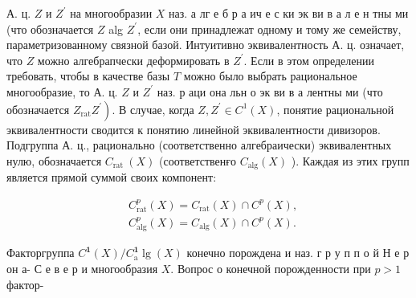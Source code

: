 \documentclass[10pt]{article}
\begin{document}
А. ц. $Z$ и $Z^{\prime}$ на многообразии $X$ наз. а лг е б р а ич е с ки эк ви в а л е н тны ми (что обозначается $Z$ alg $Z^{\prime}$, если они принадлежат одному и тому же семейству, параметризованному связной базой. Интуитивно эквивалентность А. ц. означает, что $Z$ можно алгебрапчески деформировать в $Z^{\prime}$. Если в этом определении требовать, чтобы в качестве базы $T$ можно было выбрать рациональное многообразие, то А. ц. $Z$ и $Z^{\prime}$ наз. р аци она льн о эк ви в а лентны ми (что обозначается $\left.Z_{\mathrm{rat}} Z^{\prime}\right)$. В случае, когда $Z, Z^{\prime} \in C^{1}(X)$, понятие рациональной эквивалентности сводится к понятию линейной эквивалентности дивизоров. Подгруппа А. ц., рационально (соответственно алгебраически) эквивалентных нулю, обозначается $C_{\text {rat }}(X)$ (соответственғо $C_{\mathrm{alg}}(X)$ ). Каждая из этих групп является прямой суммой своих компонент:



\[

\begin{aligned}

& C_{\mathrm{rat}}^{p}(X)=C_{\mathrm{rat}}(X) \cap C^{p}(X), \\

& C_{\mathrm{alg}}^{p}(X)=C_{\mathrm{alg}}(X) \cap C^{p}(X) .

\end{aligned}

\]



Факторгруппа $C^{\mathbf{1}}(X) / C_{\mathrm{a}}^{\mathbf{1}} \lg (X)$ конечно порождена и наз. г р у п п о й Н е р он а- С е в е р и многообразия $X$. Вопрос о конечной порожденности при $p>1$ фактор-
\end{document}
